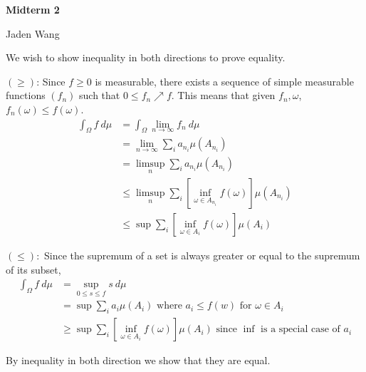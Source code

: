 \documentclass[12pt]{article}
\begin{document}
\centerline {\textsf{\textbf{\LARGE{Midterm 2}}}}
\centerline {Jaden Wang}
\vspace{.15in}

\begin{problem}[1]
We wish to show inequality in both directions to prove equality.

$(\geq)$: Since  $ f \geq 0$ is measurable, there exists a sequence of simple measurable functions $ (f_n)$ such that $ 0\leq f_n \nearrow f$. This means that given $ f_n, \omega$, $ f_n(\omega) \leq f(\omega)$.
\begin{align*}
	\int_{\Omega} f\ d \mu &= \int_{\Omega} \lim_{ n \to \infty} f_n\ d \mu \\
			       &=  \lim_{ n \to \infty}\sum_i a_{n_i} \mu(A_{n_i}) \\
                               &=  \limsup_{  n}  \sum_i a_{n_i} \mu(A_{n_i}) \\
			       &\leq \limsup_{  n} \sum_i \left[ \inf_{\omega \in A_{n_i}} f(\omega)\right] \mu(A_{n_i})\\
			       &\leq \sup \sum_i \left[ \inf_{\omega \in A_i} f(\omega) \right] \mu(A_i)  
\end{align*}

$ (\leq):$ Since the supremum of a set is always greater or equal to the supremum of its subset,
 \begin{align*}
	\int_{\Omega} f\ d \mu &= \sup_{0\leq s \leq f} s\ d \mu\\
			       &= \sup \sum_i a_i \mu(A_i) \text{ where } a_i \leq f(w) \text{ for } \omega \in A_i \\
			       &\geq \sup \sum_i \left[ \inf_{\omega \in A_i} f(\omega) \right]  \mu(A_i) \text{ since } \inf \text{ is a special case of }a_i   
\end{align*}

By inequality in both direction we show that they are equal.
\end{problem}
\end{document}
